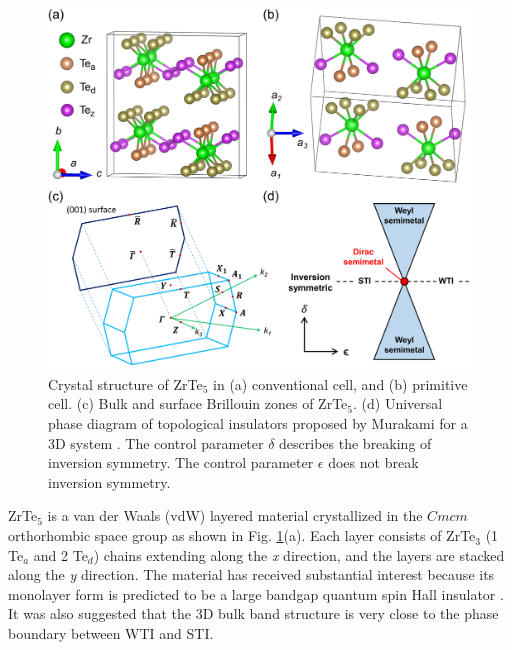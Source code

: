 	\begin{figure}[htbp]
        \centering
        \captionsetup{singlelinecheck = false, justification=justified}
        \includegraphics[width=1.0\textwidth]{ZrTe5_structure.png}
        \caption[Crystal structure and Brillouin zone of ZrTe$_5$ as well as the universal phase diagram of topological insulators.]{Crystal structure of ZrTe$_5$ in (a) conventional cell, and (b) primitive cell. (c) Bulk and surface Brillouin zones of ZrTe$_5$. (d) Universal phase diagram of topological insulators proposed by Murakami for a 3D system \cite{murakami2008universal, murakami2007phase}. The control parameter $\delta$ describes the breaking of inversion symmetry. The control parameter $\epsilon$ does not break inversion symmetry.}
        \label{ZrTe5_structure}
    \end{figure}
    
ZrTe$_5$ is a van der Waals (vdW) layered material crystallized in the $Cmcm$ orthorhombic space group as shown in Fig. \ref{ZrTe5_structure}(a). Each layer consists of ZrTe$_3$ (1 Te$_a$ and 2 Te$_d$) chains extending along the {\it x} direction, and the layers are stacked along the {\it y} direction. The material has received substantial interest because its monolayer form is predicted to be a large bandgap quantum spin Hall insulator \cite{weng2014transition}. It was also suggested that the 3D bulk band structure is very close to the phase boundary between WTI and STI.

